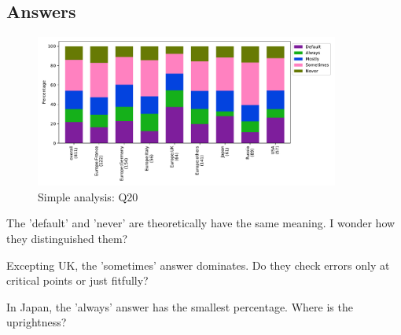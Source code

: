 
\subsection{Answers}


\begin{figure}[htb]
\begin{center}
\includegraphics[width=10cm]{../pdfs/Q20.pdf}
\caption{Simple analysis: Q20}
\label{fig:Q20}
\end{center}
\end{figure}

The 'default' and 'never' are theoretically have the same meaning. I
wonder how they distinguished them?

Excepting UK, the 'sometimes' answer dominates. Do they check errors
only at critical points or just fitfully?

In Japan, the 'always' answer has the smallest percentage.  Where is
the uprightness?
